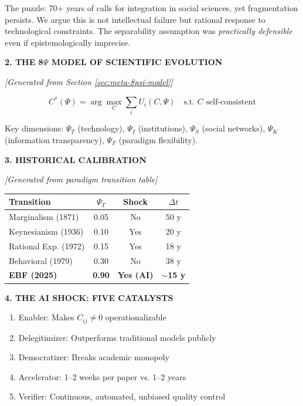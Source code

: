 \begin{tcolorbox}[colback=blue!3!white, colframe=blue!75!black,
    title=\textbf{PAPER: The AI-Driven Transformation of Economic Science: A Formal Model}]
The puzzle: 70+ years of calls for integration in social sciences, yet fragmentation persists.
We argue this is not intellectual failure but rational response to technological constraints.
The separability assumption was \textit{practically defensible} even if epistemologically imprecise.

\textbf{2. THE 8$\Psi$ MODEL OF SCIENTIFIC EVOLUTION}

\textit{[Generated from Section \ref{sec:meta-8psi-model}]}

\begin{equation}
C^*(\Psi) = \arg\max_C \sum_i U_i(C, \Psi) \quad \text{s.t. } C \text{ self-consistent}
\end{equation}

Key dimensions: $\Psi_T$ (technology), $\Psi_I$ (institutions), $\Psi_S$ (social networks),
$\Psi_K$ (information transparency), $\Psi_F$ (paradigm flexibility).

\textbf{3. HISTORICAL CALIBRATION}

\textit{[Generated from paradigm transition table]}

\begin{center}
\small
\begin{tabular}{lccc}
\toprule
Transition & $\Psi_T$ & Shock & $\Delta t$ \\
\midrule
Marginalism (1871) & 0.05 & No & 50 y \\
Keynesianism (1936) & 0.10 & Yes & 20 y \\
Rational Exp. (1972) & 0.15 & Yes & 18 y \\
Behavioral (1979) & 0.30 & No & 38 y \\
\textbf{EBF (2025)} & \textbf{0.90} & \textbf{Yes (AI)} & \textbf{$\sim$15 y} \\
\bottomrule
\end{tabular}
\end{center}

\textbf{4. THE AI SHOCK: FIVE CATALYSTS}

\begin{enumerate}[nosep]
\item Enabler: Makes $C_{ij} \neq 0$ operationalizable
\item Delegitimizer: Outperforms traditional models publicly
\item Democratizer: Breaks academic monopoly
\item Accelerator: 1--2 weeks per paper vs. 1--2 years
\item Verifier: Continuous, automated, unbiased quality control
\end{enumerate}


\end{tcolorbox}
